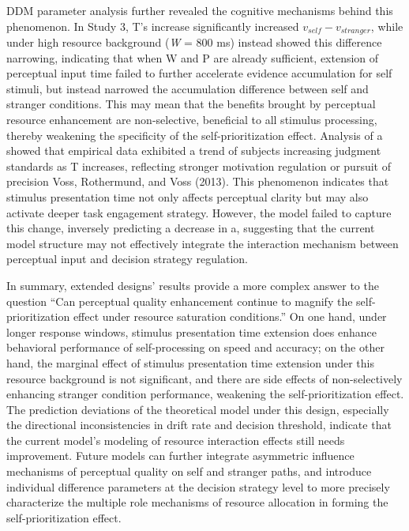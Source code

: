 \documentclass[
  english,
  man,floatsintext]{apa6}
\begin{document}
DDM parameter analysis further revealed the cognitive mechanisms behind this phenomenon. In Study 3, T's increase significantly increased \(v_{self} - v_{stranger}\), while under high resource background (\emph{W} = 800 ms) instead showed this difference narrowing, indicating that when W and P are already sufficient, extension of perceptual input time failed to further accelerate evidence accumulation for self stimuli, but instead narrowed the accumulation difference between self and stranger conditions. This may mean that the benefits brought by perceptual resource enhancement are non-selective, beneficial to all stimulus processing, thereby weakening the specificity of the self-prioritization effect. Analysis of a showed that empirical data exhibited a trend of subjects increasing judgment standards as T increases, reflecting stronger motivation regulation or pursuit of precision Voss, Rothermund, and Voss (2013). This phenomenon indicates that stimulus presentation time not only affects perceptual clarity but may also activate deeper task engagement strategy. However, the model failed to capture this change, inversely predicting a decrease in a, suggesting that the current model structure may not effectively integrate the interaction mechanism between perceptual input and decision strategy regulation.

In summary, extended designs' results provide a more complex answer to the question ``Can perceptual quality enhancement continue to magnify the self-prioritization effect under resource saturation conditions.'' On one hand, under longer response windows, stimulus presentation time extension does enhance behavioral performance of self-processing on speed and accuracy; on the other hand, the marginal effect of stimulus presentation time extension under this resource background is not significant, and there are side effects of non-selectively enhancing stranger condition performance, weakening the self-prioritization effect. The prediction deviations of the theoretical model under this design, especially the directional inconsistencies in drift rate and decision threshold, indicate that the current model's modeling of resource interaction effects still needs improvement. Future models can further integrate asymmetric influence mechanisms of perceptual quality on self and stranger paths, and introduce individual difference parameters at the decision strategy level to more precisely characterize the multiple role mechanisms of resource allocation in forming the self-prioritization effect.
\end{document}

